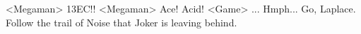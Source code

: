 <Megaman> {13}{EC}!! 
<Megaman> Ace! Acid! 
<Game> ... 
Hmph... 
Go, Laplace. Follow the trail of Noise that Joker is leaving behind. 

